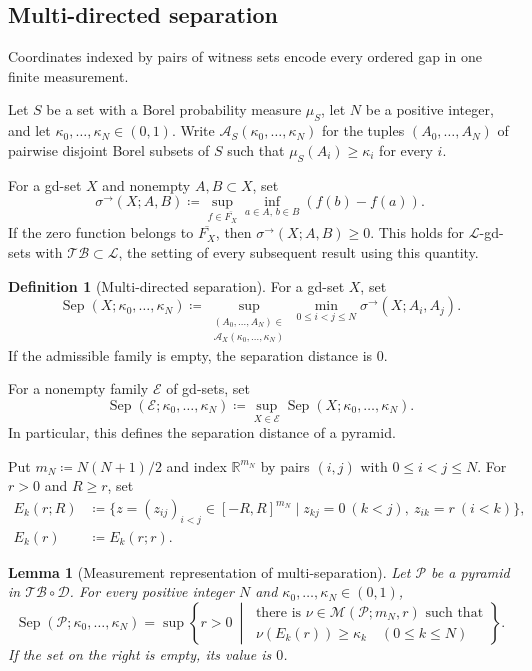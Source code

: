 \documentclass{amsart}
\theoremstyle{plain}
\newtheorem{lemma}[theorem]{Lemma}
\theoremstyle{definition}
\newtheorem{definition}[theorem]{Definition}
\theoremstyle{remark}
\newcommand{\R}{\mathbb{R}}
\newcommand{\D}{\mathcal{D}}
\newcommand{\M}{\mathcal{M}}
\newcommand{\TB}{\mathcal{TB}}
\begin{document}
\subsection{Multi-directed separation}
\label{sec:multi-directed-separation}

Coordinates indexed by pairs of witness sets encode every ordered gap in one
finite measurement.

Let $S$ be a set with a Borel probability measure $\mu_S$, let $N$ be a positive integer, and let
$\kappa_0,\ldots,\kappa_N\in(0,1)$.  Write
$\mathcal A_S(\kappa_0,\ldots,\kappa_N)$ for the tuples
$(A_0,\ldots,A_N)$ of pairwise disjoint Borel subsets of $S$ such that
$\mu_S(A_i)\geq\kappa_i$ for every $i$.

For a gd-set $X$ and nonempty $A,B\subset X$, set
\[ \sigma^{\to}(X;A,B)\coloneqq \sup_{f\in\overline{F_X}}\inf_{a\in A,\,b\in B}(f(b)-f(a)). \]
If the zero function belongs to $\overline{F_X}$, then
$\sigma^{\to}(X;A,B)\geq0$.  This holds for $\mathcal L$-gd-sets with
$\TB\subset\mathcal L$, the setting of every subsequent result using this
quantity.

\begin{definition}[Multi-directed separation]
\label{def:multi-directed-separation}
\label{def:directional-invariants}
For a gd-set $X$, set
\[
\operatorname{Sep}(X;\kappa_0,\ldots,\kappa_N)
\coloneqq
\sup_{\substack{(A_0,\ldots,A_N)\in\\
\mathcal A_X(\kappa_0,\ldots,\kappa_N)}}
\min_{0\leq i<j\leq N}\sigma^{\to}(X;A_i,A_j).
\]
If the admissible family is empty, the separation distance is $0$.
\end{definition}

For a nonempty family $\mathcal E$ of gd-sets, set
\[
\operatorname{Sep}(\mathcal E;\kappa_0,\ldots,\kappa_N)
\coloneqq\sup_{X\in\mathcal E}
\operatorname{Sep}(X;\kappa_0,\ldots,\kappa_N).
\]
In particular, this defines the separation distance of a pyramid.

Put $m_N\coloneqq N(N+1)/2$ and index $\R^{m_N}$ by pairs $(i,j)$ with
$0\leq i<j\leq N$.  For $r>0$ and $R\geq r$, set
\begin{align*}
E_k(r;R)&\coloneqq \{z=(z_{ij})_{i<j}\in[-R,R]^{m_N}\mid z_{kj}=0\ (k<j),\ z_{ik}=r\ (i<k)\},\\
E_k(r)&\coloneqq E_k(r;r).
\end{align*}

\begin{lemma}[Measurement representation of multi-separation]
\label{lem:tb-pyramid-multi-separation-measurement}
Let $\mathcal P$ be a pyramid in $\TB\circ\D$.  For every positive integer
$N$ and $\kappa_0,\ldots,\kappa_N\in(0,1)$,
\[
\operatorname{Sep}(\mathcal P;\kappa_0,\ldots,\kappa_N)
=\sup\left\{r>0\ \middle|\
\begin{array}{l}
\text{there is }\nu\in\M(\mathcal P;m_N,r)\text{ such that}\\
\nu(E_k(r))\geq\kappa_k\quad(0\leq k\leq N)
\end{array}\right\}.
\]
If the set on the right is empty, its value is $0$.
\end{lemma}
\end{document}
